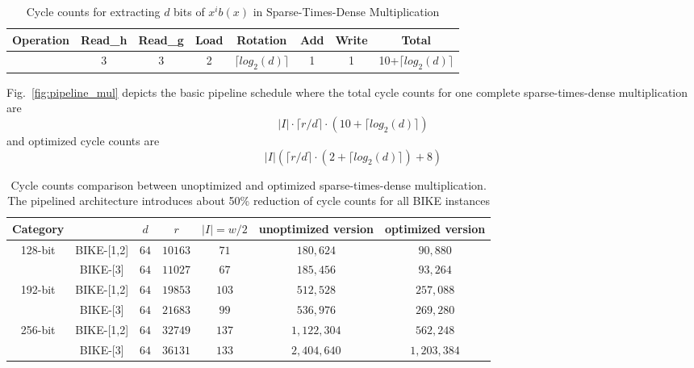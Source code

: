 \documentclass[runningheads]{llncs}
\begin{document}
\begin{table}[!tb]\centering
\caption{Cycle counts for extracting $d$ bits of $x^ib(x)$ in Sparse-Times-Dense Multiplication}
\begin{tabular}{c|c|c|c|c|c|c|c}
  \hline
  Operation & Read\_h & Read\_g & Load &Rotation & Add & Write & Total \\\hline
   & 3 & 3 & 2 & $\lceil log_2(d)\rceil$ & 1 & 1& 10+$\lceil log_2(d)\rceil$ \\
  \hline
\end{tabular}
\end{table}

Fig.~\ref{fig:pipeline_mul} depicts the basic pipeline schedule where the total cycle counts for one complete sparse-times-dense multiplication are
\[
    |I|\cdot\lceil r/d\rceil\cdot (10+\lceil log_2(d)\rceil)
\]
and optimized cycle counts are
\[
    |I|(\lceil r/d\rceil\cdot (2+\lceil log_2(d)\rceil) + 8)
\]

\begin{table}[!tb]\centering
\caption{Cycle counts comparison between unoptimized and optimized sparse-times-dense multiplication. The pipelined architecture introduces about 50\% reduction of cycle counts for all BIKE instances}
\begin{tabular}{cc|ccccc}
  \hline
 \textbf{Category}        &             & $d$ & $r$  & $|I|=w/2$  & unoptimized version& optimized version\\\hline
\multirow{ 2}{*}{128-bit} &  BIKE-[1,2] & $64$ & $10163$  & $71$  & $180,624$ & $90,880$\\
                          &  BIKE-[3] & $64$ & $11027$  & $67$  & $185,456$& $93,264$\\
  \hline
\multirow{ 2}{*}{192-bit} &  BIKE-[1,2] & $64$ & $19853$  & $103$  &$512,528$& $257,088$\\
                          &  BIKE-[3] & $64$ & $21683$  & $99$  &$536,976$& $269,280$\\
  \hline
\multirow{ 2}{*}{256-bit} &  BIKE-[1,2] & $64$ & $32749$  & $137$  &$1,122,304$& $562,248$\\
                          &  BIKE-[3] & $64$ & $36131$  & $133$  &$2,404,640$& $1,203,384$\\
  \hline
\end{tabular}
\end{table}
\end{document}
